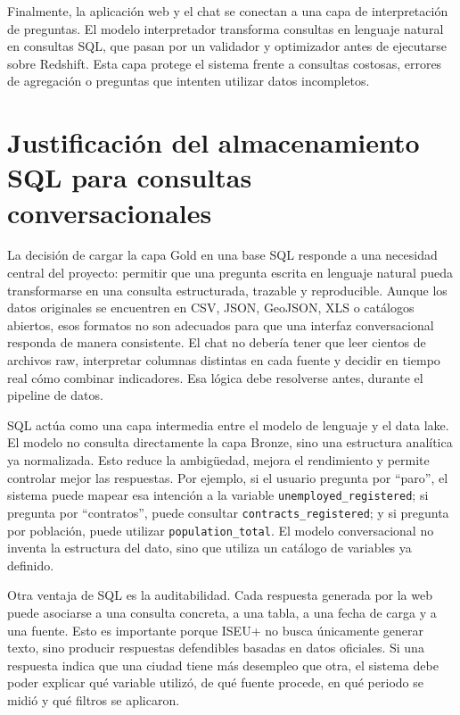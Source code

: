 Finalmente, la aplicación web y el chat se conectan a una capa de interpretación de preguntas. El modelo interpretador transforma consultas en lenguaje natural en consultas SQL, que pasan por un validador y optimizador antes de ejecutarse sobre Redshift. Esta capa protege el sistema frente a consultas costosas, errores de agregación o preguntas que intenten utilizar datos incompletos.

\section{Justificación del almacenamiento SQL para consultas conversacionales}

La decisión de cargar la capa Gold en una base SQL responde a una necesidad central del proyecto: permitir que una pregunta escrita en lenguaje natural pueda transformarse en una consulta estructurada, trazable y reproducible. Aunque los datos originales se encuentren en CSV, JSON, GeoJSON, XLS o catálogos abiertos, esos formatos no son adecuados para que una interfaz conversacional responda de manera consistente. El chat no debería tener que leer cientos de archivos raw, interpretar columnas distintas en cada fuente y decidir en tiempo real cómo combinar indicadores. Esa lógica debe resolverse antes, durante el pipeline de datos.

SQL actúa como una capa intermedia entre el modelo de lenguaje y el data lake. El modelo no consulta directamente la capa Bronze, sino una estructura analítica ya normalizada. Esto reduce la ambigüedad, mejora el rendimiento y permite controlar mejor las respuestas. Por ejemplo, si el usuario pregunta por ``paro'', el sistema puede mapear esa intención a la variable \texttt{unemployed\_registered}; si pregunta por ``contratos'', puede consultar \texttt{contracts\_registered}; y si pregunta por población, puede utilizar \texttt{population\_total}. El modelo conversacional no inventa la estructura del dato, sino que utiliza un catálogo de variables ya definido.

Otra ventaja de SQL es la auditabilidad. Cada respuesta generada por la web puede asociarse a una consulta concreta, a una tabla, a una fecha de carga y a una fuente. Esto es importante porque ISEU+ no busca únicamente generar texto, sino producir respuestas defendibles basadas en datos oficiales. Si una respuesta indica que una ciudad tiene más desempleo que otra, el sistema debe poder explicar qué variable utilizó, de qué fuente procede, en qué periodo se midió y qué filtros se aplicaron.

